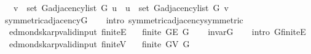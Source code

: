 \begin{isabellebody}
\ \ \ {\isachardoublequoteopen}v\ {\isasymin}\ set\ {\isacharparenleft}{\kern0pt}G{\isachardot}{\kern0pt}adjacency{\isacharunderscore}{\kern0pt}list\ G\ u{\isacharparenright}{\kern0pt}\ {\isasymlongleftrightarrow}\ u\ {\isasymin}\ set\ {\isacharparenleft}{\kern0pt}G{\isachardot}{\kern0pt}adjacency{\isacharunderscore}{\kern0pt}list\ G\ v{\isacharparenright}{\kern0pt}{\isachardoublequoteclose}%
\endisataginvisible
{\isafoldinvisible}%
%
\isadeliminvisible
\isanewline
%
\endisadeliminvisible
%
\isadelimproof
\ \ %
\endisadelimproof
%
\isatagproof
{}\isamarkupfalse%
\ symmetric{\isacharunderscore}{\kern0pt}adjacency{\isacharunderscore}{\kern0pt}G\isanewline
\ \ \isamarkupfalse%
\ {\isacharparenleft}{\kern0pt}intro\ symmetric{\isacharunderscore}{\kern0pt}adjacency{\isachardot}{\kern0pt}symmetric{\isacharparenright}{\kern0pt}%
\endisatagproof
{\isafoldproof}%
%
\isadelimproof
\isanewline
%
\endisadelimproof
%
\isadeliminvisible
\isanewline
%
\endisadeliminvisible
%
\isataginvisible
{}\isamarkupfalse%
\ {\isacharparenleft}{\kern0pt}\ edmonds{\isacharunderscore}{\kern0pt}karp{\isacharunderscore}{\kern0pt}valid{\isacharunderscore}{\kern0pt}input{\isacharparenright}{\kern0pt}\ finite{\isacharunderscore}{\kern0pt}E{\isacharcolon}{\kern0pt}\isanewline
\ \ \ {\isachardoublequoteopen}finite\ {\isacharparenleft}{\kern0pt}G{\isachardot}{\kern0pt}E\ G{\isacharparenright}{\kern0pt}{\isachardoublequoteclose}%
\endisataginvisible
{\isafoldinvisible}%
%
\isadeliminvisible
\isanewline
%
\endisadeliminvisible
%
\isadelimproof
\ \ %
\endisadelimproof
%
\isatagproof
{}\isamarkupfalse%
\ invar{\isacharunderscore}{\kern0pt}G\isanewline
\ \ \isamarkupfalse%
\ {\isacharparenleft}{\kern0pt}intro\ G{\isachardot}{\kern0pt}finite{\isacharunderscore}{\kern0pt}E{\isacharparenright}{\kern0pt}%
\endisatagproof
{\isafoldproof}%
%
\isadelimproof
\isanewline
%
\endisadelimproof
%
\isadeliminvisible
\isanewline
%
\endisadeliminvisible
%
\isataginvisible
{}\isamarkupfalse%
\ {\isacharparenleft}{\kern0pt}\ edmonds{\isacharunderscore}{\kern0pt}karp{\isacharunderscore}{\kern0pt}valid{\isacharunderscore}{\kern0pt}input{\isacharparenright}{\kern0pt}\ finite{\isacharunderscore}{\kern0pt}V{\isacharcolon}{\kern0pt}\isanewline
\ \ \ {\isachardoublequoteopen}finite\ {\isacharparenleft}{\kern0pt}G{\isachardot}{\kern0pt}V\ G{\isacharparenright}{\kern0pt}{\isachardoublequoteclose}%
\endisataginvisible
{\isafoldinvisible}%
%
\isadeliminvisible

\end{isabellebody}
